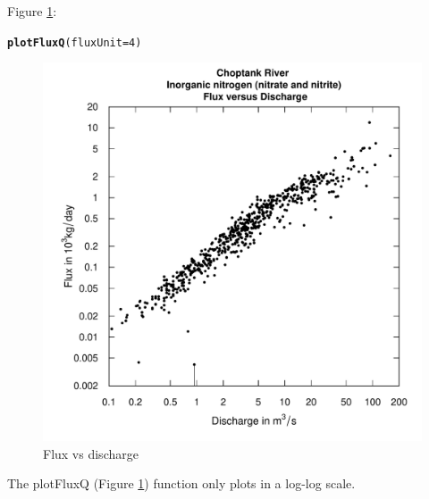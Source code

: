 \documentclass[a4paper,11pt]{article}\usepackage[]{graphicx}\usepackage[]{color}
\makeatletter
\newcommand{\hlnum}[1]{\textcolor[rgb]{0.686,0.059,0.569}{#1}}%
\newcommand{\hlstd}[1]{\textcolor[rgb]{0.345,0.345,0.345}{#1}}%
\newcommand{\hlkwc}[1]{\textcolor[rgb]{0.333,0.667,0.333}{#1}}%
\newcommand{\hlkwd}[1]{\textcolor[rgb]{0.737,0.353,0.396}{\textbf{#1}}}%
\newenvironment{kframe}{%
 \def\at@end@of@kframe{}%
 \ifinner\ifhmode%
  \def\at@end@of@kframe{\end{minipage}}%
  \begin{minipage}{\columnwidth}%
 \fi\fi%
 \def\FrameCommand##1{\hskip\@totalleftmargin \hskip-\fboxsep
 \colorbox{shadecolor}{##1}\hskip-\fboxsep
     \hskip-\linewidth \hskip-\@totalleftmargin \hskip\columnwidth}%
 \MakeFramed {\advance\hsize-\width
   \@totalleftmargin\z@ \linewidth\hsize
   \@setminipage}}%
 {\par\unskip\endMakeFramed%
 \at@end@of@kframe}
\newenvironment{knitrout}{}{} %
\makeatother
\begin{document}
Figure \ref{fig:plotFluxQ}:
\begin{knitrout}
\color{fgcolor}\begin{kframe}
\begin{alltt}
\hlkwd{plotFluxQ}\hlstd{(}\hlkwc{fluxUnit}\hlstd{=}\hlnum{4}\hlstd{)}
\end{alltt}
\end{kframe}\begin{figure}[]

\includegraphics[width=.5\linewidth,height=.5\linewidth]{figure/plotFluxQ} \caption[Flux vs discharge]{Flux vs discharge\label{fig:plotFluxQ}}
\end{figure}


\end{knitrout}

The plotFluxQ (Figure \ref{fig:plotFluxQ}) function only plots in a log-log scale.

\FloatBarrier
\end{document}
